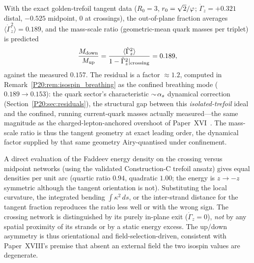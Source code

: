 \begin{proposition}
\label{P20:prop:isospin_scale}
With the exact golden-trefoil tangent data ($R_0=3$, $r_0=\sqrt2/\varphi$;
$\dot\Gamma_z=+0.321$ distal, $-0.525$ midpoint, $0$ at crossings), the
out-of-plane fraction averages $\langle\dot\Gamma_z^2\rangle=0.189$, and
the mass-scale ratio (geometric-mean quark masses per triplet) is
predicted
\begin{equation}
  \frac{M_{\mathrm{down}}}{M_{\mathrm{up}}}
  =\frac{\langle\dot\Gamma_z^2\rangle}{1-\dot\Gamma_z^2|_{\rm crossing}}
  =0.189,
  \label{P20:eq:isospin_ratio}
\end{equation}
against the measured $0.157$. The residual is a factor $\approx1.2$,
computed in Remark~\ref{P20:rem:isospin_breathing} as the confined breathing
mode ($0.189\to0.153$): the quark sector's characteristic $\sim\!\alpha_s$
dynamical correction (Section~\ref{P20:sec:residuals}), the structural gap
between this \emph{isolated-trefoil} ideal and the confined, running
current-quark masses actually measured---the same magnitude as the
charged-lepton-anchored overshoot of Paper~XVI~\cite{Paper16}. The mass-scale
ratio is thus the tangent geometry at exact leading order, the dynamical
factor supplied by that same geometry Airy-quantised under confinement.
\end{proposition}

\begin{remark}
\label{P20:rem:orientation}
A direct evaluation of the Faddeev energy density on the crossing versus
midpoint networks (using the validated Construction-C trefoil ansatz)
gives equal densities per unit arc (quartic ratio $0.94$, quadratic
$1.00$; the energy is $z\to-z$ symmetric although the tangent
orientation is not). Substituting the local curvature, the integrated
bending $\int\kappa^2\,ds$, or the inter-strand distance for the tangent
fraction reproduces the ratio less well or with the wrong sign. The
crossing network is distinguished by its purely in-plane exit
($\dot\Gamma_z=0$), \emph{not} by any spatial proximity of its strands
or by a static energy excess. The up/down asymmetry is thus orientational
and field-selection-driven, consistent with Paper~XVIII's premise that
absent an external field the two isospin values are degenerate.
\end{remark}

